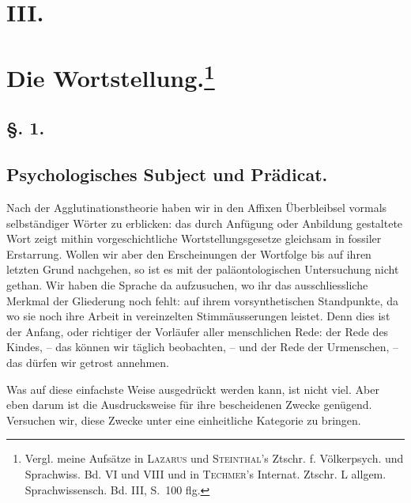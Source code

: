 
\section*{III.}\label{IV.III.III}
\section*{Die Wortstellung.\footnote{Vergl. meine Aufsätze in \textsc{Lazarus} und \textsc{Steinthal}’s Ztschr. f. Völkerpsych. und Sprachwiss. Bd. VI und VIII und in \textsc{Techmer}’s Internat. Ztschr. L allgem. Sprachwissensch. Bd. III, S.~100 flg.}}
\subsection*{§. 1.}
\subsection*{Psychologisches Subject und Prädicat.}

Nach der Agglutinationstheorie haben wir in den Affixen Überbleibsel vormals selbständiger Wörter zu erblicken: das durch Anfügung oder Anbildung gestaltete Wort zeigt mithin vorgeschichtliche Wortstellungsgesetze gleichsam in fossiler Erstarrung. Wollen wir aber den Erscheinungen der Wortfolge bis auf ihren letzten Grund nachgehen, so ist es mit der paläontologischen Untersuchung nicht gethan. Wir haben die Sprache da aufzusuchen, wo ihr das ausschliessliche Merkmal der Gliederung noch fehlt: auf ihrem vorsynthetischen Standpunkte, da wo sie noch ihre Arbeit in vereinzelten Stimmäusserungen leistet. Denn dies ist der Anfang, oder richtiger der Vorläufer aller menschlichen Rede: der Rede des Kindes, – das können wir täglich beobachten, – und der Rede der Urmenschen, – das dürfen wir getrost annehmen.

Was auf diese einfachste Weise ausgedrückt werden kann, ist nicht viel. Aber eben darum ist die Ausdrucksweise für ihre bescheidenen Zwecke genügend. Versuchen wir, diese Zwecke unter eine einheitliche Kategorie zu bringen.

\label{fp.349}


